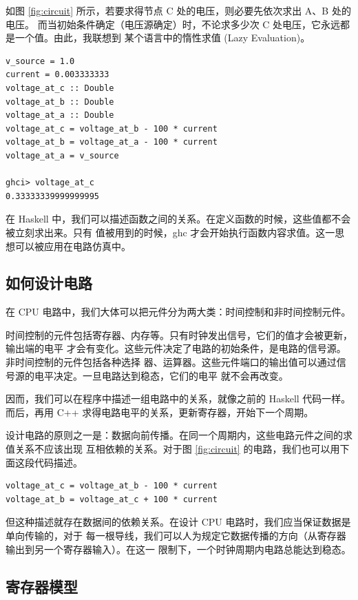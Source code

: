 \documentclass[12pt]{article}
\begin{document}
    如图 \ref{fig:circuit} 所示，若要求得节点 C 处的电压，则必要先依次求出 A、B 处的电压。
    而当初始条件确定（电压源确定）时，不论求多少次 C 处电压，它永远都是一个值。由此，我联想到
    某个语言中的惰性求值 (Lazy Evaluation)。

    \begin{verbatim}
v_source = 1.0
current = 0.003333333
voltage_at_c :: Double
voltage_at_b :: Double
voltage_at_a :: Double
voltage_at_c = voltage_at_b - 100 * current
voltage_at_b = voltage_at_a - 100 * current
voltage_at_a = v_source

ghci> voltage_at_c
0.33333339999999995
    \end{verbatim}

    在 Haskell 中，我们可以描述函数之间的关系。在定义函数的时候，这些值都不会被立刻求出来。只有
    值被用到的时候，ghc 才会开始执行函数内容求值。这一思想可以被应用在电路仿真中。

    \subsection{如何设计电路}\label{feed_forward_evaluation}

    在 CPU 电路中，我们大体可以把元件分为两大类：时间控制和非时间控制元件。

    时间控制的元件包括寄存器、内存等。只有时钟发出信号，它们的值才会被更新，输出端的电平
    才会有变化。这些元件决定了电路的初始条件，是电路的信号源。非时间控制的元件包括各种选择
    器、运算器。这些元件端口的输出值可以通过信号源的电平决定。一旦电路达到稳态，它们的电平
    就不会再改变。

    因而，我们可以在程序中描述一组电路中的关系，就像之前的 Haskell 代码一样。而后，再用
    C++ 求得电路电平的关系，更新寄存器，开始下一个周期。

    设计电路的原则之一是：数据向前传播。在同一个周期内，这些电路元件之间的求值关系不应该出现
    互相依赖的关系。对于图 \ref{fig:circuit} 的电路，我们也可以用下面这段代码描述。

    \begin{verbatim}
voltage_at_c = voltage_at_b - 100 * current
voltage_at_b = voltage_at_c + 100 * current
    \end{verbatim}

    但这种描述就存在数据间的依赖关系。在设计 CPU 电路时，我们应当保证数据是单向传输的，对于
    每一根导线，我们可以人为规定它数据传播的方向（从寄存器输出到另一个寄存器输入）。在这一
    限制下，一个时钟周期内电路总能达到稳态。

    \subsection{寄存器模型}\label{register_model}
\end{document}
